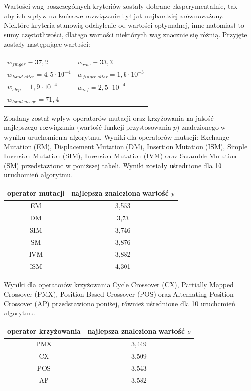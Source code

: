 \documentclass[brudnopis]{xmgr}
\begin{document}
Wartości wag poszczególnych kryteriów zostały dobrane eksperymentalnie, tak aby ich wpływ na końcowe rozwiązanie był jak najbardziej zrównoważony. Niektóre kryteria stanowią odchylenie od wartości optymalnej, inne natomiast to sumy częstotliwości, dlatego wartości niektórych wag znacznie się różnią. Przyjęte zostały następujące wartości:
\newline
\begin{tabular}{ l l }
  \indent $ w_{finger} = 37,2 $ & \indent $ w_{row} = 33,3 $ \\
  \indent $ w_{hand\_alter} = 4,5 \cdot 10^{-4} $ & \indent $ w_{finger\_alter} = 1,6 \cdot 10^{-3} $ \\
  \indent $ w_{step} = 1,9 \cdot 10^{-4} $ & \indent $ w_{isf} = 2,5 \cdot 10^{-4} $ \\
  \indent $ w_{hand\_usage} = 71,4 $ & \\
\end{tabular}\newline

Zbadany został wpływ operatorów mutacji oraz krzyżowania na jakość najlepszego rozwiązania (wartość funkcji przystosowania $p$) znalezionego w wyniku uruchomienia algorytmu. Wyniki dla operatorów mutacji: Exchange Mutation (EM), Displacement Mutation (DM), Insertion Mutation (ISM), Simple Inversion Mutation (SIM), Inversion Mutation (IVM) oraz Scramble Mutation (SM) przedstawiono w poniższej tabeli. Wyniki zostały uśrednione dla 10 uruchomień algorytmu.\newline\newline
\begin{tabular}{ c | c }
  operator mutacji & najlepsza znaleziona wartość $p$ \\
  \hline
  EM  & 3,553 \\
  DM  & 3,73 \\
  SIM & 3,746 \\
  SM  & 3,876 \\
  IVM & 3,882 \\
  ISM & 4,301 \\
\end{tabular}\newline

Wyniki dla operatorów krzyżowania Cycle Crossover (CX), Partially Mapped Crossover (PMX), Position-Based Crossover (POS) oraz Alternating-Position Crossover (AP) przedstawiono poniżej, również uśrednione dla 10 uruchomień algorytmu.

\begin{tabular}{ c | c }
  operator krzyżowania & najlepsza znaleziona wartość $p$ \\
  \hline
  PMX & 3,449 \\
  CX  & 3,509 \\
  POS & 3,543 \\
  AP  & 3,582 \\
\end{tabular}\newline
\end{document}
